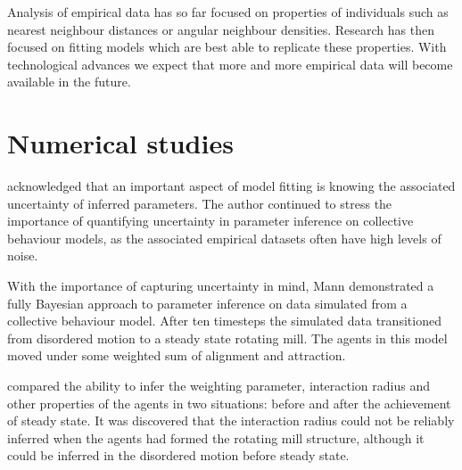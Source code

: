 Analysis of empirical data has so far focused on properties of individuals such as nearest neighbour distances or angular neighbour densities. Research has then focused on fitting models which are best able to replicate these properties. With technological advances we expect that more and more empirical data will become available in the future.

\section{Numerical studies}
\label{sec:numerical_studies}

\citet{mann11} acknowledged that an important aspect of model fitting is knowing the associated uncertainty of inferred parameters. The author continued to stress the importance of quantifying uncertainty in parameter inference on collective behaviour models, as the associated empirical datasets often have high levels of noise.

With the importance of capturing uncertainty in mind, Mann demonstrated a fully Bayesian approach to parameter inference on data simulated from a collective behaviour model. After ten timesteps the simulated data transitioned from disordered motion to a steady state rotating mill. The agents in this model moved under some weighted sum of alignment and attraction.

\citet{mann11} compared the ability to infer the weighting parameter, interaction radius and other properties of the agents in two situations: before and after the achievement of steady state. It was discovered that the interaction radius could not be reliably inferred when the agents had formed the rotating mill structure, although it could be inferred in the disordered motion before steady state. 

